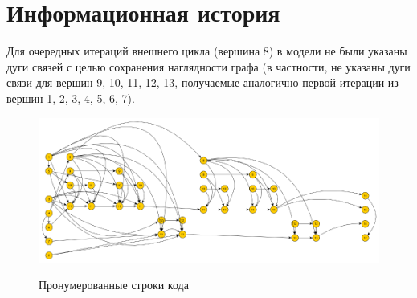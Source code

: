 \documentclass[12pt]{report}
\begin{document}
	\section{Информационная история}
	Для очередных итераций внешнего цикла (вершина 8) в модели не были указаны дуги связей с целью сохранения наглядности графа (в частности, не указаны дуги связи для вершин 9, 10, 11, 12, 13, получаемые аналогично первой итерации из вершин 1, 2, 3, 4, 5, 6, 7).
	\begin{figure}[H]	
				\centering	
	{\includegraphics[scale = 1.15]{img/ii.png}}
	\caption{Пронумерованные строки кода}
	\end{figure}
	
	
\end{document}
